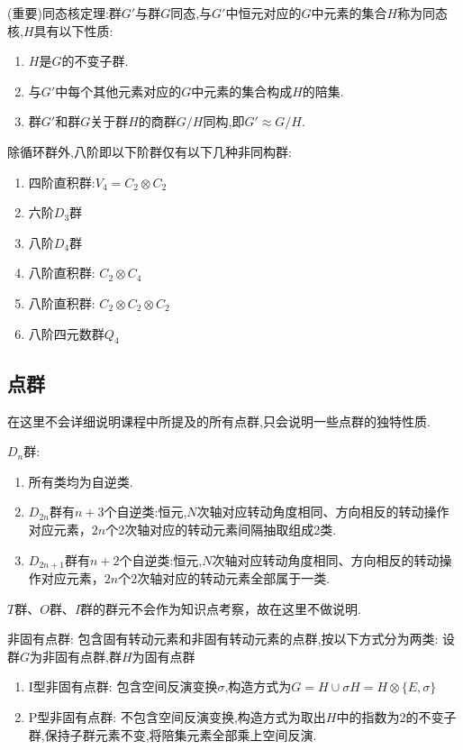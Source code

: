 \documentclass{ctexart}
\begin{document}
(重要)同态核定理:群$G'$与群$G$同态,与$G'$中恒元对应的$G$中元素的集合$H$称为同态核,$H$具有以下性质:
\begin{enumerate}
    \item $H$是$G$的不变子群.
    \item 与$G'$中每个其他元素对应的$G$中元素的集合构成$H$的陪集.
    \item 群$G'$和群$G$关于群$H$的商群$G/H$同构,即$G'\approx G/H$.
\end{enumerate}

除循环群外,八阶即以下阶群仅有以下几种非同构群:
\begin{enumerate}
    \item 四阶直积群:$V_{4}=C_{2}\otimes C_{2}$
    \item 六阶$D_{3}$群
    \item 八阶$D_{4}$群
    \item 八阶直积群: $C_{2}\otimes C_{4}$
    \item 八阶直积群: $C_{2}\otimes C_{2} \otimes C_{2}$
    \item 八阶四元数群$Q_{4}$
\end{enumerate}

\subsection{点群}

在这里不会详细说明课程中所提及的所有点群,只会说明一些点群的独特性质.

$D_{n}$群:
\begin{enumerate}
    \item 所有类均为自逆类.
    \item $D_{2n}$群有$n+3$个自逆类:恒元,$N$次轴对应转动角度相同、方向相反的转动操作对应元素，$2n$个2次轴对应的转动元素间隔抽取组成2类.
    \item $D_{2n+1}$群有$n+2$个自逆类:恒元,$N$次轴对应转动角度相同、方向相反的转动操作对应元素，$2n$个2次轴对应的转动元素全部属于一类.
\end{enumerate}

$T$群、$O$群、$I$群的群元不会作为知识点考察，故在这里不做说明.

非固有点群: 包含固有转动元素和非固有转动元素的点群,按以下方式分为两类:
设群$G$为非固有点群,群$H$为固有点群
\begin{enumerate}
    \item I型非固有点群: 包含空间反演变换$\sigma$,构造方式为$G=H\cup \sigma H=H\otimes\{E,\sigma\}$
    \item P型非固有点群: 不包含空间反演变换,构造方式为取出$H$中的指数为2的不变子群,保持子群元素不变,将陪集元素全部乘上空间反演.
\end{enumerate}
\end{document}
